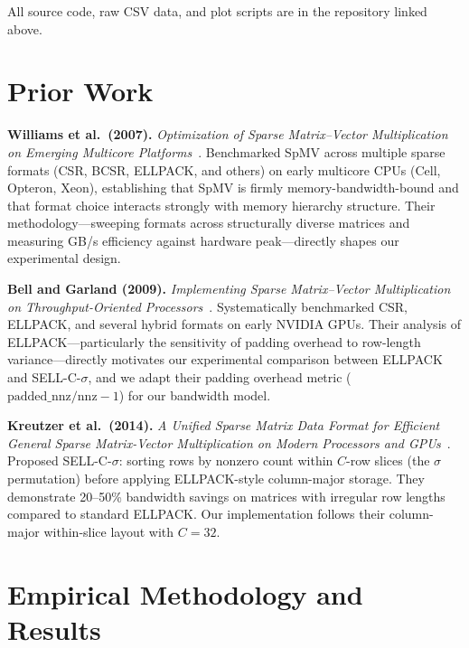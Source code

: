 \documentclass[11pt]{article}
\begin{document}
All source code, raw CSV data, and plot scripts are in the repository
linked above.

\section{Prior Work}

\textbf{Williams et al.\ (2007).}
\emph{Optimization of Sparse Matrix--Vector Multiplication on Emerging
Multicore Platforms}~\cite{williams2007}.  Benchmarked SpMV across
multiple sparse formats (CSR, BCSR, ELLPACK, and others) on early
multicore CPUs (Cell, Opteron, Xeon), establishing that SpMV is firmly
memory-bandwidth-bound and that format choice interacts strongly with
memory hierarchy structure.  Their methodology---sweeping formats across
structurally diverse matrices and measuring GB/s efficiency against
hardware peak---directly shapes our experimental design.

\textbf{Bell and Garland (2009).}
\emph{Implementing Sparse Matrix--Vector Multiplication on
Throughput-Oriented Processors}~\cite{bell2009}.
Systematically benchmarked CSR, ELLPACK, and several hybrid formats on
early NVIDIA GPUs. Their analysis of ELLPACK---particularly the sensitivity
of padding overhead to row-length variance---directly motivates our
experimental comparison between ELLPACK and SELL-C-$\sigma$, and we
adapt their padding overhead metric ($\text{padded\_nnz}/\text{nnz}-1$)
for our bandwidth model.

\textbf{Kreutzer et al.\ (2014).}
\emph{A Unified Sparse Matrix Data Format for Efficient General
Sparse Matrix-Vector Multiplication on Modern Processors and
GPUs}~\cite{kreutzer2014}.
Proposed SELL-C-$\sigma$: sorting rows by nonzero count within
$C$-row slices (the $\sigma$ permutation) before applying ELLPACK-style
column-major storage.  They demonstrate 20--50\% bandwidth savings on
matrices with irregular row lengths compared to standard ELLPACK.  Our
implementation follows their column-major within-slice layout with $C=32$.

\section{Empirical Methodology and Results}
\end{document}
